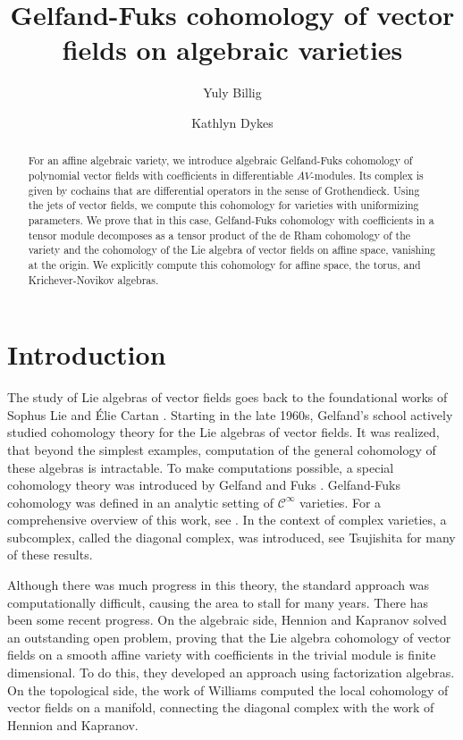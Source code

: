 \documentclass[12pt]{amsart}
\title{Gelfand-Fuks cohomology of vector fields on algebraic varieties}
\author{Yuly Billig}
\author{Kathlyn Dykes}
\theoremstyle{definition}
\begin{document}
\let\thefootnote\relax{}

\begin{abstract}
For an affine algebraic variety, we introduce algebraic Gelfand-Fuks cohomology of polynomial vector fields with coefficients in differentiable $AV$-modules. Its complex is given by cochains that are differential operators in the sense of Grothendieck. Using the jets of vector fields, we compute this cohomology for varieties with uniformizing parameters. We prove that in this case, Gelfand-Fuks cohomology with coefficients in a tensor module decomposes as a tensor product of the de Rham cohomology of the variety and the cohomology of the Lie algebra of vector fields on affine space, vanishing at the origin. We explicitly compute this cohomology for affine space, the torus, and Krichever-Novikov algebras. 
\end{abstract}

\maketitle

\section{Introduction}

The study of Lie algebras of vector fields goes back to the foundational works of Sophus Lie \cite{Lie1880} and \'Elie Cartan \cite{Cartan1909}.
Starting in the late 1960s, Gelfand's school actively studied cohomology theory for the Lie algebras of vector fields. It was realized, that beyond the simplest examples, computation of the general cohomology of these algebras is intractable. To make computations possible, a special cohomology theory was introduced by Gelfand and Fuks \cite{GelfandFuks}. Gelfand-Fuks cohomology was defined in an analytic setting of $\mathcal{C}^\infty$ varieties.  
For a comprehensive overview of this work, see \cite{Fuks1986}. In the context of complex varieties, a subcomplex, called the diagonal complex, was introduced, see Tsujishita \cite{Tsujishita1981} for many of these results. 

Although there was much progress in this theory, the standard approach was computationally difficult, causing the area to stall for many years. There has been some recent progress. On the algebraic side, Hennion and Kapranov \cite{HennionKarpranov2022} solved an outstanding open problem, proving that  the Lie algebra cohomology of vector fields on a smooth affine variety with coefficients in the trivial module is finite dimensional. To do this, they developed an approach using factorization algebras. On the topological side, the work of Williams \cite{Williams24} computed the local cohomology of vector fields on a manifold, connecting the diagonal complex with the work of Hennion and Kapranov.
\end{document}
